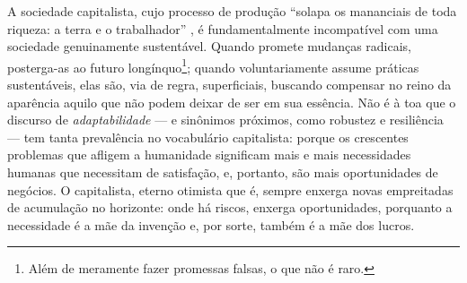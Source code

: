 \documentclass[12pt]{article}
\numberwithin{equation}{section}
\theoremstyle{plain}
\theoremstyle{definition}
\theoremstyle{remark}
\begin{document}

A sociedade capitalista, cujo processo de produção ``solapa os mananciais de toda riqueza: a terra e o trabalhador'' \parencite[p. 573]{Marx2017}, é fundamentalmente incompatível com uma sociedade genuinamente sustentável. Quando promete mudanças radicais, posterga-as ao futuro longínquo\footnote{Além de meramente fazer promessas falsas, o que não é raro.}; quando voluntariamente assume práticas sustentáveis, elas são, via de regra, superficiais, buscando compensar no reino da aparência aquilo que não podem deixar de ser em sua essência. Não é à toa que o discurso de \textit{adaptabilidade} --- e sinônimos próximos, como robustez e resiliência --- tem tanta prevalência no vocabulário capitalista: porque os crescentes problemas que afligem a humanidade significam mais e mais necessidades humanas que necessitam de satisfação, e, portanto, são mais oportunidades de negócios. O capitalista, eterno otimista que é, sempre enxerga novas empreitadas de acumulação no horizonte: onde há riscos, enxerga oportunidades, porquanto a necessidade é a mãe da invenção e, por sorte, também é a mãe dos lucros.




\printbibliography
\end{document}
